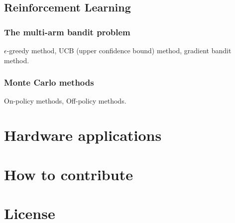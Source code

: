 \documentclass{book}
\begin{document}
\section{Reinforcement Learning}

\subsection{The multi-arm bandit problem}

$\epsilon$-greedy method, UCB (upper confidence bound) method, gradient bandit method.

\subsection{Monte Carlo methods}

On-policy methods, Off-policy methods.



\chapter{Hardware applications}


\chapter{How to contribute}

\chapter{License}
\end{document}
